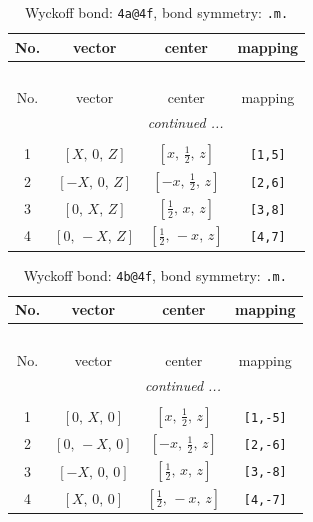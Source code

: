 \documentclass[fleqn,8pt]{jsarticle}
\begin{document}
\begin{longtable}{cccc}
\caption{Wyckoff bond: {\tt 4a@4f}, bond symmetry: {\tt .m.}}
 \\
 \hline \hline
No. & vector & center & mapping \\ \hline \endfirsthead

\multicolumn{3}{l}{\tablename\ \thetable{}} \\
 \hline \hline
No. & vector & center & mapping \\ \hline \endhead

 \hline \hline
\multicolumn{3}{r}{\footnotesize\it continued ...} \\ \endfoot

 \hline \hline
\multicolumn{3}{r}{} \\ \endlastfoot

1 & $\left[ X,\, 0,\, Z \right]$ & $\left[ x,\, \frac{1}{2},\, z \right]$ & {\tt [1,5]} \\ \hline
2 & $\left[ - X,\, 0,\, Z \right]$ & $\left[ - x,\, \frac{1}{2},\, z \right]$ & {\tt [2,6]} \\ \hline
3 & $\left[ 0,\, X,\, Z \right]$ & $\left[ \frac{1}{2},\, x,\, z \right]$ & {\tt [3,8]} \\ \hline
4 & $\left[ 0,\, - X,\, Z \right]$ & $\left[ \frac{1}{2},\, - x,\, z \right]$ & {\tt [4,7]} \\
\end{longtable}
\renewcommand{\arraystretch}{1.2}
\begin{longtable}{cccc}
\caption{Wyckoff bond: {\tt 4b@4f}, bond symmetry: {\tt .m.}}
 \\
 \hline \hline
No. & vector & center & mapping \\ \hline \endfirsthead

\multicolumn{3}{l}{\tablename\ \thetable{}} \\
 \hline \hline
No. & vector & center & mapping \\ \hline \endhead

 \hline \hline
\multicolumn{3}{r}{\footnotesize\it continued ...} \\ \endfoot

 \hline \hline
\multicolumn{3}{r}{} \\ \endlastfoot

1 & $\left[ 0,\, X,\, 0 \right]$ & $\left[ x,\, \frac{1}{2},\, z \right]$ & {\tt [1,-5]} \\ \hline
2 & $\left[ 0,\, - X,\, 0 \right]$ & $\left[ - x,\, \frac{1}{2},\, z \right]$ & {\tt [2,-6]} \\ \hline
3 & $\left[ - X,\, 0,\, 0 \right]$ & $\left[ \frac{1}{2},\, x,\, z \right]$ & {\tt [3,-8]} \\ \hline
4 & $\left[ X,\, 0,\, 0 \right]$ & $\left[ \frac{1}{2},\, - x,\, z \right]$ & {\tt [4,-7]} \\
\end{longtable}
\end{document}
